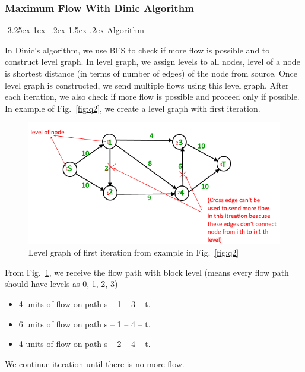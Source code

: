 \documentclass[a4paper]{article}
\makeatletter
\newcounter {subsubsubsection}[subsubsection]
\newcommand\subsubsubsection{\@startsection{subsubsubsection}{4}{\z@}%
                                     {-3.25ex\@plus -1ex \@minus -.2ex}%
                                     {1.5ex \@plus .2ex}%
                                     {\normalfont\normalsize\bfseries}}
\makeatother
\begin{document}
\subsubsection{Maximum Flow With Dinic Algorithm}
\subsubsubsection{Algorithm}
\par
In Dinic’s algorithm, we use BFS to check if more flow is possible and to construct level graph. In level graph, we assign levels to all nodes, level of a node is shortest distance (in terms of number of edges) of the node from source. Once level graph is constructed, we send multiple flows using this level graph.
After each iteration, we also check if more flow is possible and proceed only if possible.\\
In example of Fig.~\ref{fig:q2}, we create a level graph with first iteration.
\begin{figure}[H]\centering
	\includegraphics[width=\linewidth ]{QUES2DINIC1.png}
	\caption{Level graph of first iteration from example in Fig.~\ref{fig:q2}}
	\label{fig:q21}
\end{figure}
From Fig.~\ref{fig:q21}, we receive the flow path with block level (means every flow path should have levels as 0, 1, 2, 3)
\begin{itemize}
	\item 4 units of flow on path s – 1 – 3 – t. 
	\item 6 units of flow on path s – 1 – 4 – t. 
	\item 4 units of flow on path s – 2 – 4 – t. 
\end{itemize}
We continue iteration until there is no more flow.
\end{document}
